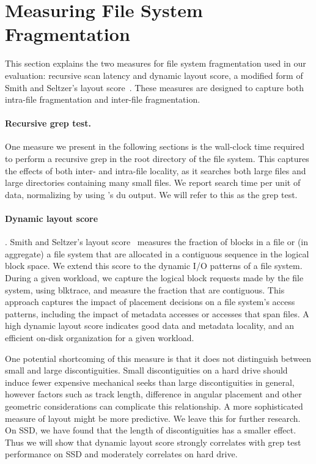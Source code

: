 \section{Measuring File System Fragmentation}\label{sec:fsa-metrics}

This section explains the two measures for file system fragmentation used in
our evaluation: recursive scan latency and dynamic layout score, a modified
form of Smith and Seltzer's layout score~\cite{DBLP:conf/sigmetrics/SmithS97}.
These measures are designed to capture both intra-file fragmentation and
inter-file fragmentation. 

\paragraph{Recursive grep test.} One measure we present in the following
sections is the wall-clock time required to perform a recursive grep in the
root directory of the file system.  This captures the effects of both inter-
and intra-file locality, as it searches both large files and large directories
containing many small files.  We report search time per unit of data,
normalizing by using \ext's du output.  We will refer to this as the grep test. 

\paragraph{Dynamic layout score}.  Smith and Seltzer's layout
score~\cite{DBLP:conf/sigmetrics/SmithS97} measures the fraction of blocks in a
file or (in aggregate) a file system that are allocated in a contiguous
sequence in the logical block space.  We extend this score to the dynamic I/O
patterns of a file system.  During a given workload, we capture the logical
block requests made by the file system, using blktrace, and measure the
fraction that are contiguous.  This approach captures the impact of placement
decisions on a file system's access patterns, including the impact of metadata
accesses or accesses that span files.  A high dynamic layout score indicates
good data and metadata locality, and an efficient on-disk organization for a
given workload.

One potential shortcoming of this measure is that it does not distinguish
between small and large discontiguities. Small discontiguities on a hard drive
should induce fewer expensive mechanical seeks than large discontiguities in
general, however factors such as track length, difference in angular placement
and other geometric considerations can complicate this relationship. A more
sophisticated measure of layout might be more predictive.  We leave this for
further research. On SSD, we have found that the length of discontiguities has
a smaller effect.  Thus we will show that dynamic layout score strongly
correlates with grep test performance on SSD and moderately correlates on hard
drive.
